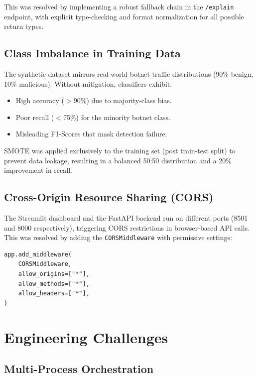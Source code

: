This was resolved by implementing a robust fallback chain in the \texttt{/explain} endpoint, with explicit type-checking and format normalization for all possible return types.

\subsection{Class Imbalance in Training Data}

The synthetic dataset mirrors real-world botnet traffic distributions (90\% benign, 10\% malicious). Without mitigation, classifiers exhibit:
\begin{itemize}
    \item High accuracy ($>$90\%) due to majority-class bias.
    \item Poor recall ($<$75\%) for the minority botnet class.
    \item Misleading F1-Scores that mask detection failure.
\end{itemize}

SMOTE was applied exclusively to the training set (post train-test split) to prevent data leakage, resulting in a balanced 50:50 distribution and a 20\% improvement in recall.

\subsection{Cross-Origin Resource Sharing (CORS)}

The Streamlit dashboard and the FastAPI backend run on different ports (8501 and 8000 respectively), triggering CORS restrictions in browser-based API calls. This was resolved by adding the \texttt{CORSMiddleware} with permissive settings:

\begin{lstlisting}[caption={CORS Configuration}, label={lst:cors}]
app.add_middleware(
    CORSMiddleware,
    allow_origins=["*"],
    allow_methods=["*"],
    allow_headers=["*"],
)
\end{lstlisting}

\section{Engineering Challenges}

\subsection{Multi-Process Orchestration}

